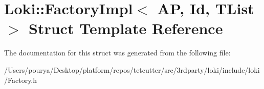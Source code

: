 \hypertarget{structLoki_1_1FactoryImpl}{}\section{Loki\+:\+:Factory\+Impl$<$ A\+P, Id, T\+List $>$ Struct Template Reference}
\label{structLoki_1_1FactoryImpl}


The documentation for this struct was generated from the following file\+:\begin{DoxyCompactItemize}
\item 
/\+Users/pourya/\+Desktop/platform/repos/tetcutter/src/3rdparty/loki/include/loki/Factory.\+h\end{DoxyCompactItemize}
